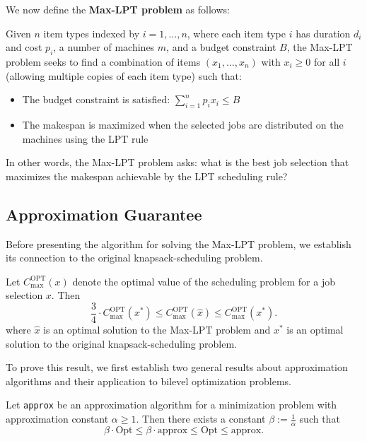 We now define the \textbf{Max-LPT problem} as follows:

\begin{definition}
\label{def:maxlpt-problem}
Given $n$ item types indexed by $i = 1, \ldots, n$, where each item type $i$ has duration $d_i$ and cost $p_i$, a number of machines $m$, and a budget constraint $B$, the Max-LPT problem seeks to find a combination of items $(x_1, \ldots, x_n)$ with $x_i \geq 0$ for all $i$ (allowing multiple copies of each item type) such that:
\begin{itemize}
    \item The budget constraint is satisfied: $\sum_{i=1}^{n} p_i x_i \leq B$
    \item The makespan is maximized when the selected jobs are distributed on the machines using the LPT rule
\end{itemize}
\end{definition}

In other words, the Max-LPT problem asks: what is the best job selection that maximizes the makespan achievable by the LPT scheduling rule?

\subsection{Approximation Guarantee}

Before presenting the algorithm for solving the Max-LPT problem, we establish its connection to the original knapsack-scheduling problem.

\begin{theorem}
\label{thm:maxlpt-approx}
Let $C_{\max}^{\text{OPT}}(x)$ denote the optimal value of the scheduling problem for a job selection $x$. Then
\begin{equation*}
\frac{3}{4} \cdot C_{\max}^{\text{OPT}}({x^*}) \leq C_{\max}^{\text{OPT}}(\hat{x}) \leq C_{\max}^{\text{OPT}}({x^*}).
\end{equation*}
where $\hat{x}$ is an optimal solution to the Max-LPT problem and $x^*$ is an optimal solution to the original knapsack-scheduling problem.
\end{theorem}

To prove this result, we first establish two general results about approximation algorithms and their application to bilevel optimization problems.

\begin{lemma}
\label{lem:approx-properties}
Let \texttt{approx} be an approximation algorithm for a minimization problem with approximation constant $\alpha \ge 1$. Then there exists a constant $\beta := \frac{1}{\alpha}$ such that
\[
\beta \cdot \mathrm{Opt} \le \beta \cdot \mathrm{approx} \le \mathrm{Opt} \le \mathrm{approx}.
\]
\end{lemma}

